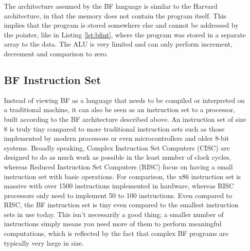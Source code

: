 The architecture assumed by the BF language is similar to the Harvard architecture, in that the memory does not contain the program itself. This implies that the program is stored somewhere else and cannot be addressed by the pointer, like in Listing \ref{lst:bfint}, where the program was stored in a separate array to the data. The ALU is very limited and can only perform increment, decrement and comparison to zero.


\subsection{BF Instruction Set}
Instead of viewing BF as a language that needs to be compiled or interpreted on a traditional machine, it can also be seen as an instruction set to a processor, built according to the BF architecture described above. An instruction set of size 8 is truly tiny compared to more traditional instruction sets such as those implemented by modern processors or even microcontrollers and older 8-bit systems. Broadly speaking, Complex Instruction Set Computers (CISC) are designed to do as much work as possible in the least number of clock cycles, whereas Reduced Instruction Set Computers (RISC) focus on having a small instruction set with basic operations. For comparison, the x86 instruction set is massive with over 1500 instructions implemented in hardware, whereas RISC processors only need to implement 50 to 100 instructions. Even compared to RISC, the BF instruction set is tiny even compared to the smallest instruction sets in use today. This isn't necessarily a good thing; a smaller number of instructions simply means you need more of them to perform meaningful computations, which is reflected by the fact that complex BF programs are typically very large in size.


